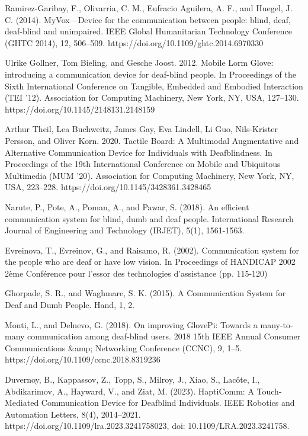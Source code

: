 \documentclass[12pt,a4paper]{report}
\begin{document}
\begin{thebibliography}{35}
Ramirez-Garibay, F., Olivarria, C. M., Eufracio Aguilera, A. F., and Huegel, J. C. (2014). MyVox—Device for the communication between people: blind, deaf, deaf-blind and unimpaired. IEEE Global Humanitarian Technology Conference (GHTC 2014), 12, 506–509. https://doi.org/10.1109/ghtc.2014.6970330


Ulrike Gollner, Tom Bieling, and Gesche Joost. 2012. Mobile Lorm Glove: introducing a communication device for deaf-blind people. In Proceedings of the Sixth International Conference on Tangible, Embedded and Embodied Interaction (TEI '12). Association for Computing Machinery, New York, NY, USA, 127–130. https://doi.org/10.1145/2148131.2148159

Arthur Theil, Lea Buchweitz, James Gay, Eva Lindell, Li Guo, Nils-Krister Persson, and Oliver Korn. 2020. Tactile Board: A Multimodal Augmentative and Alternative Communication Device for Individuals with Deafblindness. In Proceedings of the 19th International Conference on Mobile and Ubiquitous Multimedia (MUM '20). Association for Computing Machinery, New York, NY, USA, 223–228. https://doi.org/10.1145/3428361.3428465

Narute, P., Pote, A., Poman, A., and Pawar, S. (2018). An efficient communication system for blind, dumb and deaf people. International Research Journal of Engineering and Technology (IRJET), 5(1), 1561-1563.

Evreinova, T., Evreinov, G., and Raisamo, R. (2002). Communication system for the people who are deaf or have low vision. In Proceedings of HANDICAP 2002 2ème Conférence pour l'essor des technologies d'assistance (pp. 115-120)

Ghorpade, S. R., and Waghmare, S. K. (2015). A Communication System for Deaf and Dumb People. Hand, 1, 2.

Monti, L., and Delnevo, G. (2018). On improving GlovePi: Towards a many-to-many communication among deaf-blind users. 2018 15th IEEE Annual Consumer Communications \&amp; Networking Conference (CCNC), 9, 1–5. https://doi.org/10.1109/ccnc.2018.8319236

Duvernoy, B., Kappassov, Z., Topp, S., Milroy, J., Xiao, S., Lacôte, I., Abdikarimov, A., Hayward, V., and Ziat, M. (2023). HaptiComm: A Touch-Mediated Communication Device for Deafblind Individuals. IEEE Robotics and Automation Letters, 8(4), 2014–2021. https://doi.org/10.1109/lra.2023.3241758023, doi: 10.1109/LRA.2023.3241758.
\end{thebibliography}
\end{document}
